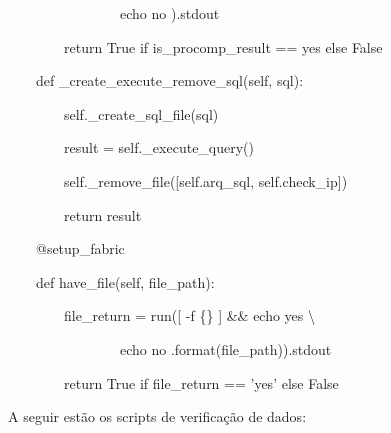             {\ttfamily\color[rgb]{0.10980392,0.10980392,0.10980392}
            \ \ \ \ \ \ \ \ \ \ \ \ \ \ \ \ echo {\textquotedbl}no{\textquotedbl}
            {\textquotedbl}{\textquotedbl}{\textquotedbl}).stdout}


    \bigskip

{\ttfamily\color[rgb]{0.10980392,0.10980392,0.10980392}
    \ \ \ \ \ \ \ \ return True if is\_procomp\_result == {\textquotedbl}yes{\textquotedbl} else False}


    \bigskip

{\ttfamily\color[rgb]{0.10980392,0.10980392,0.10980392}
    \ \ \ \ def \_create\_execute\_remove\_sql(self, sql):}

{\ttfamily\color[rgb]{0.10980392,0.10980392,0.10980392}
    \ \ \ \ \ \ \ \ self.\_create\_sql\_file(sql)}

{\ttfamily\color[rgb]{0.10980392,0.10980392,0.10980392}
    \ \ \ \ \ \ \ \ result = self.\_execute\_query()}

{\ttfamily\color[rgb]{0.10980392,0.10980392,0.10980392}
    \ \ \ \ \ \ \ \ self.\_remove\_file([self.arq\_sql, self.check\_ip])}


    \bigskip

{\ttfamily\color[rgb]{0.10980392,0.10980392,0.10980392}
    \ \ \ \ \ \ \ \ return result}


    \bigskip

{\ttfamily\color[rgb]{0.10980392,0.10980392,0.10980392}
    \ \ \ \ @setup\_fabric}

{\ttfamily\color[rgb]{0.10980392,0.10980392,0.10980392}
    \ \ \ \ def have\_file(self, file\_path):}

{\ttfamily\color[rgb]{0.10980392,0.10980392,0.10980392}
    \ \ \ \ \ \ \ \ file\_return = run({\textquotedbl}{\textquotedbl}{\textquotedbl}[ -f \{\} ] \&\& echo
            {\textquotedbl}yes{\textquotedbl} {\textbar}{\textbar} {\textbackslash}}

            {\ttfamily\color[rgb]{0.10980392,0.10980392,0.10980392}
            \ \ \ \ \ \ \ \ \ \ \ \ \ \ \ \ echo {\textquotedbl}no{\textquotedbl}
            {\textquotedbl}{\textquotedbl}{\textquotedbl}.format(file\_path)).stdout}


    \bigskip

{\ttfamily\color[rgb]{0.10980392,0.10980392,0.10980392}
    \ \ \ \ \ \ \ \ return True if file\_return == 'yes' else False}


    \bigskip

{\color{black}
    A seguir est\~ao os scripts de verifica\c{c}\~ao de dados:}

